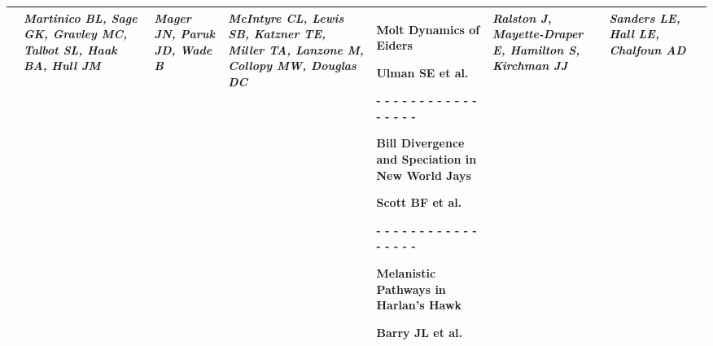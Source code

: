 \begin{tabular}{|x{0.8cm}|x{2.65cm}|x{2.65cm}|a{2.65cm}|x{2.65cm}|x{2.65cm}|x{2.65cm}|@{}m{0pt}@{}}
& \par \vspace{8pt} \textit{Martinico BL, Sage GK, Gravley MC, Talbot SL, Haak BA, Hull JM} &  \par \vspace{8pt} \textit{Mager JN, Paruk JD, Wade B} &  \par \vspace{8pt} \textit{McIntyre CL, Lewis SB, Katzner TE, Miller TA, Lanzone M, Collopy MW, Douglas DC} & \scriptsize Molt Dynamics of Eiders\par \tiny Ulman SE et al. \par - - - - - - - - - - - - - - - - - \par \vspace{2pt} \scriptsize Bill Divergence and Speciation in New World Jays\par \tiny Scott BF et al. \par - - - - - - - - - - - - - - - - - \par \vspace{2pt} \scriptsize Melanistic Pathways in Harlan's Hawk\par \tiny Barry JL et al.  &  \par \vspace{8pt} \textit{Ralston J, Mayette-Draper E, Hamilton S, Kirchman JJ} &  \par \vspace{8pt} \textit{Sanders LE, Hall LE, Chalfoun AD}&\\[25ex]
\hline

\end{tabular}
